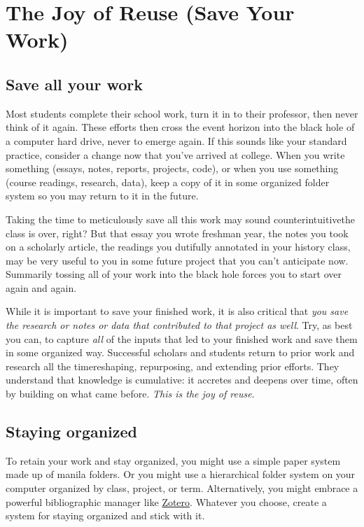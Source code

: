 
\hypertarget{joyofreuse}{}

\chapter{The Joy of Reuse (Save Your Work)}


\section{Save all your work}

Most students complete their school work, turn it in to their professor, then never think of it again. These efforts then cross the event horizon into the black hole of a computer hard drive, never to emerge again. If this sounds like your standard practice, consider a change now that you've arrived at college. When you write something (essays, notes, reports, projects, code), or when you use something (course readings, research, data), keep a copy of it in some organized folder system so you may return to it in the future. 

Taking the time to meticulously save all this work may sound counterintuitive\textemdash the class is over, right? But that essay you wrote freshman year, the notes you took on a scholarly article, the readings you dutifully annotated in your history class, may be very useful to you in some future project that you can't anticipate now. Summarily tossing all of your work into the black hole forces you to start over again and again. 

While it is important to save your finished work, it is also critical that \emph{you save the research or notes or data that contributed to that project as well}. Try, as best you can, to capture \emph{all} of the inputs that led to your finished work and save them in some organized way. Successful scholars and students return to prior work and research all the time\textemdash reshaping, repurposing, and extending prior efforts. They understand that knowledge is cumulative: it accretes and deepens over time, often by building on what came before. \emph{This is the joy of reuse}. 

\section{Staying organized}

To retain your work and stay organized, you might use a simple paper system made up of manila folders. Or you might use a hierarchical folder system on your computer organized by class, project, or term. Alternatively, you might embrace a powerful bibliographic manager like \href{www.zotero.org}{Zotero}. Whatever you choose, create a system for staying organized and stick with it. 

